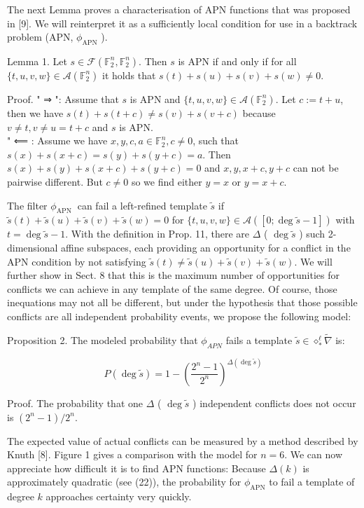 \documentclass[10pt]{article}
\begin{document}
The next Lemma proves a characterisation of APN functions that was proposed in [9]. We will reinterpret it as a sufficiently local condition for use in a backtrack problem (APN, $\phi_{\mathrm{APN}}$ ).

Lemma 1. Let $s \in \mathcal{F}\left(\mathbb{F}_{2}^{n}, \mathbb{F}_{2}^{n}\right)$. Then $s$ is APN if and only if for all $\{t, u, v, w\} \in \mathcal{A}\left(\mathbb{F}_{2}^{n}\right)$ it holds that $s(t)+s(u)+s(v)+s(w) \neq 0$.

Proof. " ⇒ ": Assume that $s$ is APN and $\{t, u, v, w\} \in \mathcal{A}\left(\mathbb{F}_{2}^{n}\right)$. Let $c:=t+u$, then we have $s(t)+s(t+c) \neq s(v)+s(v+c)$ because $v \neq t, v \neq u=t+c$ and $s$ is APN.\\
" ⟸ : Assume we have $x, y, c, a \in \mathbb{F}_{2}^{n}, c \neq 0$, such that $s(x)+s(x+c)= s(y)+s(y+c)=a$. Then $s(x)+s(y)+s(x+c)+s(y+c)=0$ and $x, y, x+c, y+c$ can not be pairwise different. But $c \neq 0$ so we find either $y=x$ or $y=x+c$.

The filter $\phi_{\text {APN }}$ can fail a left-refined template $\tilde{s}$ if $\tilde{s}(t)+\tilde{s}(u)+\tilde{s}(v)+\tilde{s}(w)=0$ for $\{t, u, v, w\} \in \mathcal{A}([0 ; \operatorname{deg} \tilde{s}-1])$ with $t=\operatorname{deg} \tilde{s}-1$. With the definition in Prop. 11, there are $\Delta$ ( $\operatorname{deg} \tilde{s}$ ) such 2-dimensional affine subspaces, each providing an opportunity for a conflict in the APN condition by not satisfying $\tilde{s}(t) \neq \tilde{s}(u)+\tilde{s}(v)+\tilde{s}(w)$. We will further show in Sect. 8 that this is the maximum number of opportunities for conflicts we can achieve in any template of the same degree. Of course, those inequations may not all be different, but under the hypothesis that those possible conflicts are all independent probability events, we propose the following model:

Proposition 2. The modeled probability that $\phi_{A P N}$ fails a template $\tilde{s} \in \diamond_{*}^{\ell} \widetilde{\nabla}$ is:


\begin{equation*}
P(\operatorname{deg} \tilde{s})=1-\left(\frac{2^{n}-1}{2^{n}}\right)^{\Delta(\operatorname{deg} \tilde{s})} \tag{3}
\end{equation*}


Proof. The probability that one $\Delta$ ( $\operatorname{deg} \tilde{s}$ ) independent conflicts does not occur is $\left(2^{n}-1\right) / 2^{n}$.

The expected value of actual conflicts can be measured by a method described by Knuth [8]. Figure 1 gives a comparison with the model for $n=6$. We can now appreciate how difficult it is to find APN functions: Because $\Delta(k)$ is approximately quadratic (see (22)), the probability for $\phi_{\mathrm{APN}}$ to fail a template of degree $k$ approaches certainty very quickly.
\end{document}
